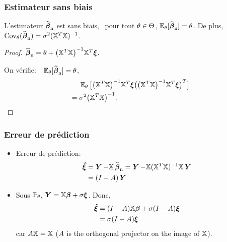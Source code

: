 \begin{frame}
\frametitle{Estimateur sans biais}
\begin{theo}
L'estimateur $\operatorname{\widehat{\boldsymbol{\beta}}_n}$ est sans biais, \ie\ pour tout $\theta \in \Theta$, $\operatorname{{\mathbb E}}_{\theta}[\operatorname{\widehat{\boldsymbol{\beta}}_n}]= \theta$. De plus,
$\mathrm{Cov}_{\theta}(\operatorname{\widehat{\boldsymbol{\beta}}_n})= \sigma^2 (\mathbb{X}^T \mathbb{X})^{-1}$.
\end{theo}
\pause
\begin{proof}
$\operatorname{\widehat{\boldsymbol{\beta}}_n} = \theta + \big(\mathbb{X}^T\mathbb{X}\big)^{-1}\mathbb{X}^T
\boldsymbol{\xi}$.

On vérifie: $\ \ \E_{\truetheta}[\estregress]=\truetheta$,
\begin{align*}
&\operatorname{{\mathbb E}}_{\theta}\big[ \big(\mathbb{X}^T\mathbb{X}\big)^{-1}\mathbb{X}^T \boldsymbol{\xi} \big(\big(\mathbb{X}^T\mathbb{X}\big)^{-1}\mathbb{X}^T \boldsymbol{\xi}\big)^T\big] \\
=\; &\sigma^2\big(\mathbb{X}^T\mathbb{X}\big)^{-1}.
\end{align*}
\end{proof}
\end{frame}

\begin{frame}
\frametitle{Erreur de prédiction}
\begin{itemize}
\item \alert{Erreur de prédiction}:
\begin{align*}
\boldsymbol{\hat{\xi}}
&= \operatorname{\boldsymbol{Y}} - \mathbb{X} \operatorname{\widehat{\boldsymbol{\beta}}_n}= \operatorname{\boldsymbol{Y}} - \mathbb{X} (\mathbb{X}^T \mathbb{X})^{-1} \mathbb{X} \operatorname{\boldsymbol{Y}} \\
&= (I - A) \operatorname{\boldsymbol{Y}}
\end{align*}
\item Sous $\operatorname{{\mathbb P}}_\theta$, $\operatorname{\boldsymbol{Y}}= \mathbb{X} \boldsymbol{\beta} +  \sigma \boldsymbol{\xi}$. Donc,
\begin{align*}
\boldsymbol{\hat{\xi}} &= (I-A) \mathbb{X} \boldsymbol{\beta} + \sigma (I-A)  \boldsymbol{\xi} \\
         &= \sigma (I-A) \boldsymbol{\xi}
\end{align*}
car $A \mathbb{X}= \mathbb{X}$ ($A$ is the orthogonal projector on the image of $\mathbb{X}$).
\end{itemize}
\end{frame}

